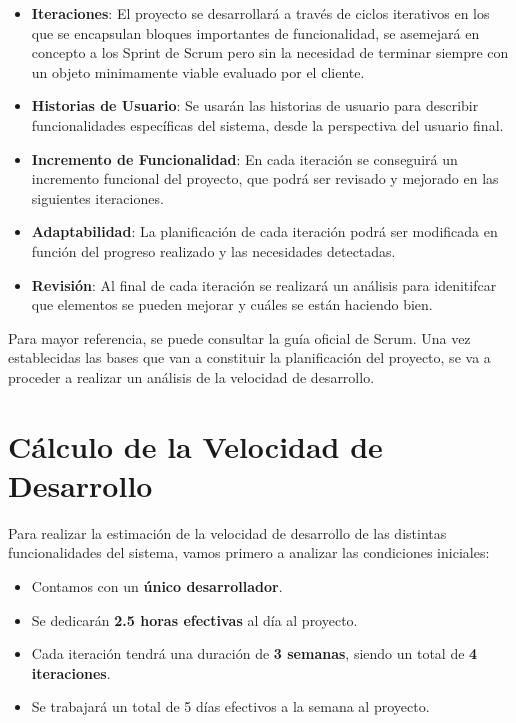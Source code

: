 \begin{itemize}
    \item \textbf{Iteraciones}: El proyecto se desarrollará a través de ciclos iterativos en los que se encapsulan bloques importantes de funcionalidad, se asemejará en concepto a los Sprint de Scrum pero sin la necesidad de terminar siempre con un objeto minimamente viable evaluado por el cliente.
    \item \textbf{Historias de Usuario}: Se usarán las historias de usuario para describir funcionalidades específicas del sistema, desde la perspectiva del usuario final.
    \item \textbf{Incremento de Funcionalidad}: En cada iteración se conseguirá un incremento funcional del proyecto, que podrá ser revisado y mejorado en las siguientes iteraciones.
    \item \textbf{Adaptabilidad}: La planificación de cada iteración podrá ser modificada en función del progreso realizado y las necesidades detectadas.
    \item \textbf{Revisión}: Al final de cada iteración se realizará un análisis para idenitifcar que elementos se pueden mejorar y cuáles se están haciendo bien.
\end{itemize}

Para mayor referencia, se puede consultar la guía oficial de Scrum\cite{scrumguide2020}. 
Una vez establecidas las bases que van a constituir la planificación del proyecto, se va a proceder a realizar un análisis de la velocidad de desarrollo.

\section{Cálculo de la Velocidad de Desarrollo}
\label{sec:velocidad-desarrollo}
Para realizar la estimación de la velocidad de desarrollo de las distintas funcionalidades del sistema, vamos primero a analizar las condiciones iniciales:

\begin{itemize}
    \item Contamos con un \textbf{único desarrollador}.
    \item Se dedicarán \textbf{2.5 horas efectivas} al día al proyecto.
    \item Cada iteración tendrá una duración de \textbf{3 semanas}, siendo un total de \textbf{4 iteraciones}.
    \item Se trabajará un total de 5 días efectivos a la semana al proyecto.
\end{itemize}

